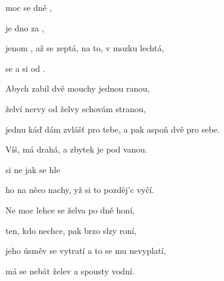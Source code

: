

\zs
{} moc  se   dně ,   

  je   dno za ,    

{jenom} , až se zeptá, na to,  v mozku lechtá,

 se  a  si  od .   
\ks

\zs
Abych zabil dvě mouchy jednou ranou,

želví nervy od želvy schovám stranou,

jednu káď dám zvlášť pro tebe, a pak aspoň dvě pro sebe.

Víš, má drahá, a zbytek je pod vanou.
\ks

\zr
{} si   ne jak se   hle

 ho na {něco} nachy, yž si to pozděj’c 
vyčí.
\kr

\zs
Ne moc lehce se želva po dně honí,

ten, kdo nechce, pak brzo slzy roní,

jeho úsměv se vytratí a to se mu nevyplatí,

má se nebát želev a spousty vodní.
\ks

\zr  \kr

\kp



















